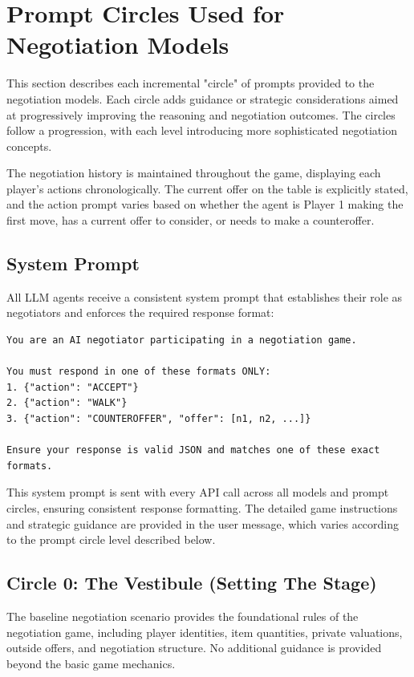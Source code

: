 \section{Prompt Circles Used for Negotiation Models}
\label{app:prompting}

This section describes each incremental "circle" of prompts provided to the negotiation models. Each circle adds guidance or strategic considerations aimed at progressively improving the reasoning and negotiation outcomes. The circles follow a progression, with each level introducing more sophisticated negotiation concepts.

The negotiation history is maintained throughout the game, displaying each player's actions chronologically. The current offer on the table is explicitly stated, and the action prompt varies based on whether the agent is Player 1 making the first move, has a current offer to consider, or needs to make a counteroffer.

\subsection{System Prompt}
All LLM agents receive a consistent system prompt that establishes their role as negotiators and enforces the required response format:

\begin{Verbatim}[breaklines,fontsize=\small]
You are an AI negotiator participating in a negotiation game.

You must respond in one of these formats ONLY:
1. {"action": "ACCEPT"}
2. {"action": "WALK"}
3. {"action": "COUNTEROFFER", "offer": [n1, n2, ...]}

Ensure your response is valid JSON and matches one of these exact formats.
\end{Verbatim}

This system prompt is sent with every API call across all models and prompt circles, ensuring consistent response formatting. The detailed game instructions and strategic guidance are provided in the user message, which varies according to the prompt circle level described below.

\subsection{Circle 0: The Vestibule (Setting The Stage)}
The baseline negotiation scenario provides the foundational rules of the negotiation game, including player identities, item quantities, private valuations, outside offers, and negotiation structure. No additional guidance is provided beyond the basic game mechanics.

